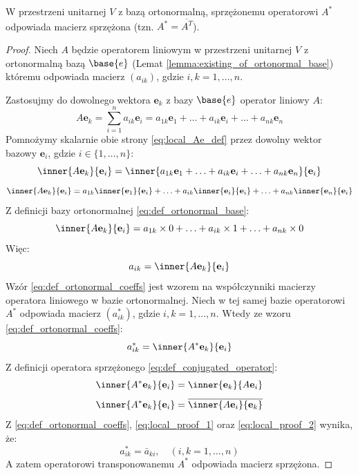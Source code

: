 \begin{theorem}
    W przestrzeni unitarnej $V$ z bazą ortonormalną, sprzężonemu operatorowi $A^*$ odpowiada macierz sprzężona (tzn. $A^* = \overline{A^T}$).
\end{theorem}
\begin{proof}
    Niech $A$ będzie operatorem liniowym w przestrzeni unitarnej $V$ z  ortonormalną bazą $\base{e}$ (Lemat \ref{lemma:existing_of_ortonormal_base}) któremu odpowiada macierz $(a_{ik})$, gdzie $i, k = 1, \ldots, n$.

    Zastosujmy do dowolnego wektora $\mathbf{e}_k$ z bazy $\base{e}$ operator liniowy $A$:
    \begin{equation}\label{eq:local_Ae_def}
        A\mathbf{e}_k = \sum_{i=1}^{n}{a_{ik}\mathbf{e}_i} = a_{1k}\mathbf{e}_1 + \ldots + a_{ik}\mathbf{e}_i + \ldots + a_{nk}\mathbf{e}_n
    \end{equation}
    Pomnożymy skalarnie obie strony \eqref{eq:local_Ae_def} przez dowolny wektor bazowy $\mathbf{e}_i$, gdzie $i \in \{1, \ldots, n\}$:
    $$\inner{A\mathbf{e}_k}{\mathbf{e}_i} = \inner{
        a_{1k}\mathbf{e}_1 + \ldots + a_{ik}\mathbf{e}_i + \ldots + a_{nk}\mathbf{e}_n
    }{\mathbf{e}_i}$$
    $$\inner{A\mathbf{e}_k}{\mathbf{e}_i} = a_{1k}\inner{\mathbf{e}_1}{\mathbf{e}_i} + \ldots + a_{ik}\inner{\mathbf{e}_i}{\mathbf{e}_i} + \ldots + a_{nk}\inner{\mathbf{e}_n}{\mathbf{e}_i}$$
    Z definicji bazy ortonormalnej \eqref{eq:def_ortonormal_base}:
    $$\inner{A\mathbf{e}_k}{\mathbf{e}_i} = a_{1k} \times 0 + \ldots + a_{ik}\times 1 + \ldots + a_{nk} \times 0$$
    Więc:
    \begin{equation}\label{eq:def_ortonormal_coeffs}
        a_{ik} = \inner{A\mathbf{e}_k}{\mathbf{e}_i}
    \end{equation}
    Wzór \eqref{eq:def_ortonormal_coeffs} jest wzorem na współczynniki macierzy operatora liniowego w bazie ortonormalnej.
    Niech w tej samej bazie operatorowi $A^*$ odpowiada macierz $(a^*_{ik})$, gdzie $i, k = 1, \ldots, n$.
    Wtedy ze wzoru \eqref{eq:def_ortonormal_coeffs}:
    \begin{equation}\label{eq:local_proof_1}
        a^*_{ik} = \inner{A^*\mathbf{e}_k}{\mathbf{e}_i}
    \end{equation}
    Z definicji operatora sprzężonego \eqref{eq:def_conjugated_operator}:
    $$\inner{A^*\mathbf{e}_k}{\mathbf{e}_i} = \inner{\mathbf{e}_k}{A\mathbf{e}_i}$$
    \begin{equation}\label{eq:local_proof_2}
        \inner{A^*\mathbf{e}_k}{\mathbf{e}_i} = \overline{\inner{A\mathbf{e}_i}{\mathbf{e}_k}}
    \end{equation}
    Z \eqref{eq:def_ortonormal_coeffs}, \eqref{eq:local_proof_1} oraz \eqref{eq:local_proof_2} wynika, że:
    $$a^*_{ik} = \bar{a}_{ki}, \quad (i, k = 1, \ldots, n)$$
    A zatem operatorowi transponowanemu $A^*$ odpowiada macierz sprzężona.
\end{proof}

